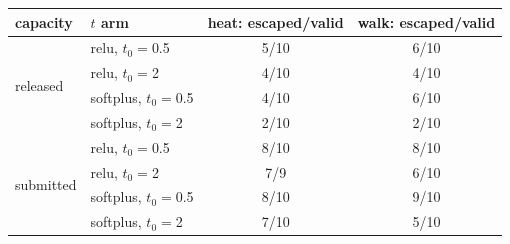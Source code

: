 \begin{tabular}{@{}llcc@{}}
\toprule
capacity & $t$ arm & heat: escaped/valid & walk: escaped/valid \\
\midrule
\multirow{4}{*}{released} & relu, $t_0{=}$0.5 & 5/10 & 6/10 \\
 & relu, $t_0{=}$2 & 4/10 & 4/10 \\
 & softplus, $t_0{=}$0.5 & 4/10 & 6/10 \\
 & softplus, $t_0{=}$2 & 2/10 & 2/10 \\
\midrule
\multirow{4}{*}{submitted} & relu, $t_0{=}$0.5 & 8/10 & 8/10 \\
 & relu, $t_0{=}$2 & 7/9 & 6/10 \\
 & softplus, $t_0{=}$0.5 & 8/10 & 9/10 \\
 & softplus, $t_0{=}$2 & 7/10 & 5/10 \\
\bottomrule
\end{tabular}

